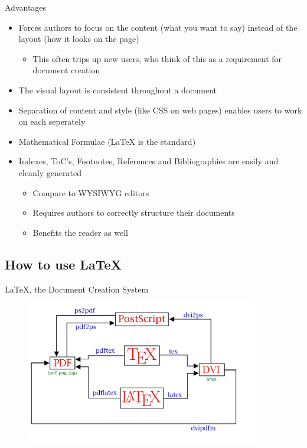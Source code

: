 \documentclass{beamer}
\begin{document}
\begin{frame}{Advantages}
  \begin{itemize}
  \item
    Forces authors to focus on the content (what you want to say)
      instead of the layout (how it looks on the page)
  \begin{itemize}
    \item
      This often trips up new users, who think of this as a
        requirement for document creation
  \end{itemize}
  \item
    The visual layout is consistent throughout a document
  \item
    Separation of content and style (like CSS on web pages)
    enables users to work on each seperately
  \item
    Mathematical Formulae (LaTeX is the standard)
  \item
    Indexes, ToC's, Footnotes, References and Bibliographies are
      easily and cleanly generated
  \begin{itemize}
    \item
      Compare to WYSIWYG editors
    \item
      Requires authors to correctly structure their documents
    \item
      Benefits the reader as well
  \end{itemize}
  \end{itemize}
\end{frame}

\subsection{How to use \LaTeX}

\begin{frame}{\LaTeX, the Document Creation System}
    \begin{figure}
        \begin{center}
        \includegraphics[width=0.9\textwidth]{LaTeXdiagram}
        \end{center}
    \end{figure}
\end{frame}
\end{document}
